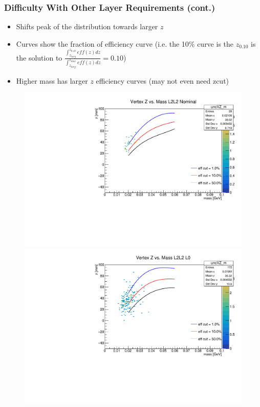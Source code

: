 \documentclass{beamer}
\begin{document}
\begin{frame}
\frametitle{Difficulty With Other Layer Requirements (cont.)}
\begin{itemize}
\item Shifts peak of the distribution towards larger $z$
\item Curves show the fraction of efficiency curve (i.e. the 10\% curve is the $z_{0.10}$ is the solution to $\frac{\int_{z_{targ}}^{z_{0.10}}eff(z)dz}{\int_{z_{targ}}^{z_{max}}eff(z)dz}=0.10$)
\item Higher mass has larger $z$ efficiency curves (may not even need zcut)
\end{itemize}
\begin{figure}
\includegraphics[width=0.4\linewidth]{figs/L2L2_sharedcut.pdf}
\includegraphics[width=0.4\linewidth]{figs/L2L2_loose.pdf}
\end{figure}

\end{frame}

\end{document}
